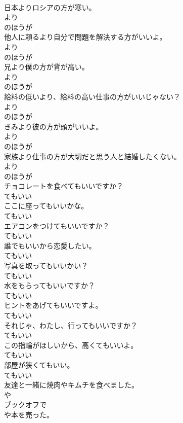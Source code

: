 \documentclass[8pt]{extreport}
\begin{document}
\begin{CJK}{UTF8}{min}
\\	日本よりロシアの方が寒い。	
\\	より 
\\	のほうが 
\\	他人に頼るより自分で問題を解決する方がいいよ。	
\\	より 
\\	のほうが 
\\	兄より僕の方が背が高い。	
\\	より 
\\	のほうが 
\\	給料の低いより、給料の高い仕事の方がいいじゃない？	
\\	より 
\\	のほうが 
\\	きみより彼の方が頭がいいよ。	
\\	より 
\\	のほうが 
\\	家族より仕事の方が大切だと思う人と結婚したくない。	
\\	より 
\\	のほうが 
\\	チョコレートを食べてもいいですか？	
\\	てもいい	
\\	ここに座ってもいいかな。	
\\	てもいい	
\\	エアコンをつけてもいいですか？	
\\	てもいい	
\\	誰でもいいから恋愛したい。	
\\	てもいい	
\\	写真を取ってもいいかい？	
\\	てもいい	
\\	水をもらってもいいですか？	
\\	てもいい	
\\	ヒントをあげてもいいですよ。	
\\	てもいい	
\\	それじゃ、わたし、行ってもいいですか？	
\\	てもいい	
\\	この指輪がほしいから、高くてもいいよ。	
\\	てもいい	
\\	部屋が狭くてもいい。	
\\	てもいい	
\\	友達と一緒に焼肉やキムチを食べました。	
\\	や	
\\	ブックオフで
\\	や本を売った。	

\end{CJK}
\end{document}
